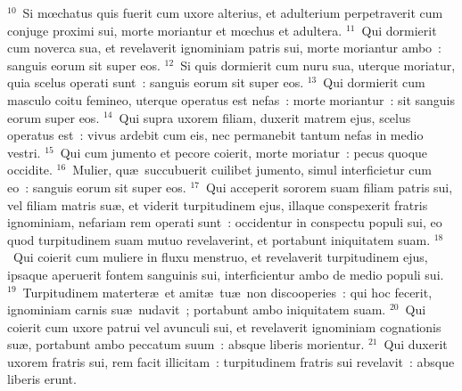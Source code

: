${}^{10}$~Si mœchatus quis fuerit cum uxore alterius, et adulterium perpetraverit cum conjuge proximi sui, morte moriantur et mœchus et adultera.
${}^{11}$~Qui dormierit cum noverca sua, et revelaverit ignominiam patris sui, morte moriantur ambo~: sanguis eorum sit super eos.
${}^{12}$~Si quis dormierit cum nuru sua, uterque moriatur, quia scelus operati sunt~: sanguis eorum sit super eos.
${}^{13}$~Qui dormierit cum masculo coitu femineo, uterque operatus est nefas~: morte moriantur~: sit sanguis eorum super eos.
${}^{14}$~Qui supra uxorem filiam, duxerit matrem ejus, scelus operatus est~: vivus ardebit cum eis, nec permanebit tantum nefas in medio vestri.
${}^{15}$~Qui cum jumento et pecore coierit, morte moriatur~: pecus quoque occidite.
${}^{16}$~Mulier, qu\ae\ succubuerit cuilibet jumento, simul interficietur cum eo~: sanguis eorum sit super eos.
${}^{17}$~Qui acceperit sororem suam filiam patris sui, vel filiam matris su\ae , et viderit turpitudinem ejus, illaque conspexerit fratris ignominiam, nefariam rem operati sunt~: occidentur in conspectu populi sui, eo quod turpitudinem suam mutuo revelaverint, et portabunt iniquitatem suam.
${}^{18}$~Qui coierit cum muliere in fluxu menstruo, et revelaverit turpitudinem ejus, ipsaque aperuerit fontem sanguinis sui, interficientur ambo de medio populi sui.
${}^{19}$~Turpitudinem materter\ae\ et amit\ae\ tu\ae\ non discooperies~: qui hoc fecerit, ignominiam carnis su\ae\ nudavit~; portabunt ambo iniquitatem suam.
${}^{20}$~Qui coierit cum uxore patrui vel avunculi sui, et revelaverit ignominiam cognationis su\ae , portabunt ambo peccatum suum~: absque liberis morientur.
${}^{21}$~Qui duxerit uxorem fratris sui, rem facit illicitam~: turpitudinem fratris sui revelavit~: absque liberis erunt.


